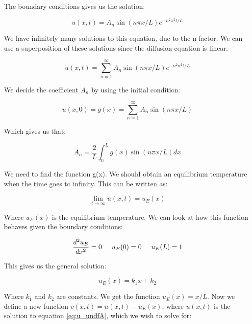 \documentclass{article}
\begin{document}
The boundary conditions gives us the solution:

\begin{equation}
u(x,t) = A_n\sin{(n\pi x/L)}e^{-n^2\pi^2t/L}
\end{equation}

We have infinitely many solutions to this equation, due to the n factor. We can use a superposition of these solutions since the diffusion equation is linear:

\begin{equation}
u(x,t) = \sum_{n=1}^{\infty}A_n\sin{(n\pi x/L)}e^{-n^2\pi^2t/L}
\label{eq:u_undfA}
\end{equation}

We decide the coefficient $A_n$ by using the initial condition:

\begin{equation}
u(x,0)=g(x)=\sum_{n=1}^{\infty}A_n\sin{(n\pi x/L)}
\end{equation}

Which gives us that:

\begin{equation*}
A_n=\frac{2}{L}\int_0^Lg(x)\sin{(n\pi x/L)} dx
\end{equation*}

We need to find the function g(x). We should obtain an equilibrium temperature when the time goes to infinity. This can be written as:

\begin{equation*}
\lim_{t \to \infty} u(x,t) = u_E(x)
\end{equation*}

Where $u_E(x)$ is the equilibrium temperature. We can look at how this function behaves given the boundary conditions:

\begin{equation*}
\frac{d^2 u_E}{dx^2}=0 \hspace{0.5cm} u_E(0)=0\hspace{0.5cm} u_E(L)=1
\end{equation*}

This gives us the general solution:

\begin{equation*}
u_E(x)=k_1x + k_2
\end{equation*}

Where $k_1$ and $k_2$ are constants. We get the function $u_E(x)=x/L$. Now we define a new function $v(x,t)=u(x,t)-u_E(x)$, where $u(x,t)$ is the solution to equation \ref{eq:u_undfA}, which we wish to solve for:
\end{document}
